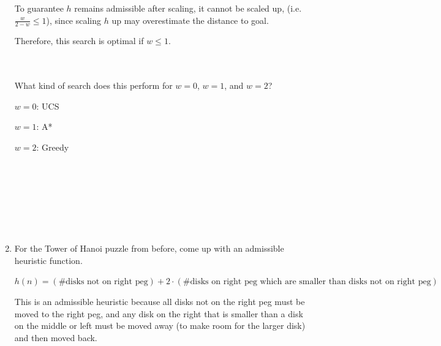\documentclass[11pt]{article}
\begin{document}
\begin{enumerate}
{To guarantee $h$ remains admissible after scaling, it cannot be scaled up,
(i.e. $\frac{w}{2 - w} \le 1$), since
scaling $h$ up may overestimate the distance to goal.

Therefore, this search is optimal if $w \le 1$.}
\\ \\
What kind of search does this perform for $w = 0$, $w = 1$, and $w = 2$?

{\color{blue}
$w = 0$: UCS

$w = 1$: A*

$w = 2$: Greedy} 
\\ \\ \\ \\ \\ \\

\item
For the Tower of Hanoi puzzle from before, come up with an admissible
heuristic function.

{\color{blue}
$h(n) = (\# \text{disks not on right peg}) + 2 \cdot
(\# \text{disks on right peg which are smaller than disks
not on right peg})$

This is an admissible heuristic because all disks not on the right peg must
be moved to the right peg, and any disk on the right that is smaller than a disk
on the middle or left must be moved away (to make room for the larger disk)
and then moved back.
}
\end{enumerate}

\newpage


\clearpage
\clearpage
\end{document}
